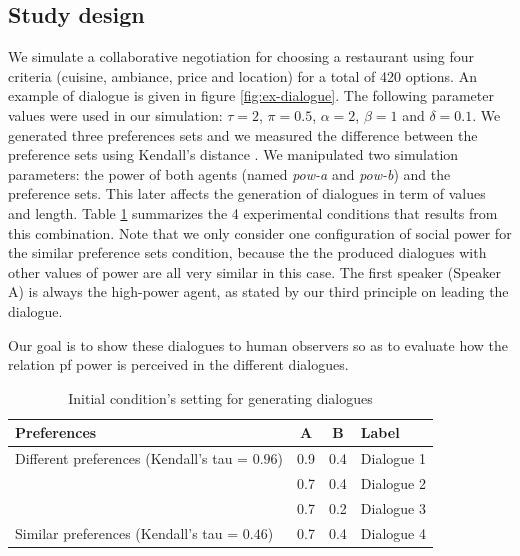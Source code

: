 \documentclass{llncs}
\begin{document}
		\subsection{Study design}
		We simulate a collaborative negotiation for choosing a restaurant using four criteria (cuisine, ambiance, price and location) for a total of 420 options. An example of dialogue is given in figure \ref{fig:ex-dialogue}. The following parameter values were used in our simulation: $\tau=2$, $\pi=0.5$, $\alpha=2$, $\beta=1$ and $\delta=0.1$. We generated three preferences sets and we measured the difference between the preference sets using Kendall's distance \cite{bra2013Kendall}. We manipulated two simulation parameters: the power of both agents (named \emph{pow-a} and \emph{pow-b}) and the preference sets. This later affects the generation of dialogues in term of values and length.  Table \ref{table:conditions} summarizes the 4 experimental conditions that results from this combination. Note that we only consider one configuration of social power for the similar preference sets condition, because the the produced dialogues with other values of power are all very similar in this case. The first speaker (Speaker A) is always the high-power agent, as stated by our  third principle on leading the dialogue.
		
		Our goal is to show these dialogues to human observers so as to evaluate how the relation pf power is perceived in the different dialogues.
		\begin{table}[t]
			\centering
			\begin{tabular}{ |l|c|c|l| }
				\hline
				\textbf{Preferences}& \textbf{A} & \textbf{B} & \textbf{Label} \\ 
				\hline
				\newline\multirow{3}{*} {Different preferences (Kendall's tau = $0.96$)} & 0.9 & 0.4 & Dialogue 1 \\ \cline{2-4}
				
				\newline  & 0.7 & 0.4 & Dialogue 2\\ \cline{2-4}
				
				\newline   &0.7 & 0.2 & Dialogue 3\\ 
				\hline
				\newline Similar preferences (Kendall's tau = $0.46$) & 0.7 & 0.4 & Dialogue 4\\
				\hline
			\end{tabular}
			\caption{Initial condition's setting for generating dialogues} 
			\label{table:conditions}
		\end{table}
		
\end{document}
